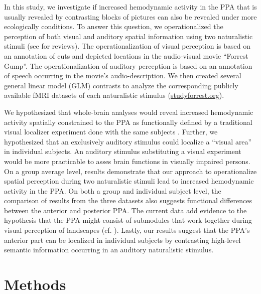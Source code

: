 \documentclass[english]{article}
\begin{document}
In this study, we investigate if increased hemodynamic activity in the PPA that
is usually revealed by contrasting blocks of pictures can also be revealed under
more ecologically conditions.
To answer this question, we operationalized the perception of both visual and
auditory spatial information using two naturalistic stimuli (see
\citep{hamilton2018revolution, hasson2008neurocinematics,
sonkusare2019naturalistic} for reviews).
The operationalization of visual perception is based on an annotation of cuts
and depicted locations in the audio-visual movie ``Forrest Gump''.
The operationalization of auditory perception is based on an annotation of
speech occurring in the movie's audio-description.
We then created several general linear model (GLM) contrasts to analyze the
corresponding publicly available fMRI datasets of each naturalistic stimulus
\citep{hanke2016simultaneous, hanke2014audiomovie}
(\href{http://www.studyforrest.org}{studyforrest.org}).

We hypothesized that whole-brain analyses would reveal increased hemodynamic
activity spatially constrained to the PPA as functionally defined by a
traditional visual localizer experiment done with the same subjects
\citep{sengupta2016extension}.
Further, we hypothesized that an exclusively auditory stimulus could localize a
``visual area'' in individual subjects.
An auditory stimulus substituting a visual experiment would be more practicable
to asses brain functions in visually impaired persons.
On a group average level,
results demonstrate that our approach to operationalize spatial perception
during two naturalistic stimuli lead to increased hemodynamic activity in the
PPA.
On both a group and individual subject level, the comparison of results from the
three datasets also suggests functional differences between the anterior and
posterior PPA.
The current data add evidence to the hypothesis that the PPA might consist of
submodules that work together during visual perception of landscapes (cf.
\citep{baldassano2013differential}).
%
Lastly, our results suggest that the PPA's anterior part can be localized in
individual subjects by contrasting high-level semantic information occurring in
an auditory naturalistic stimulus.


\section{Methods}
\end{document}
